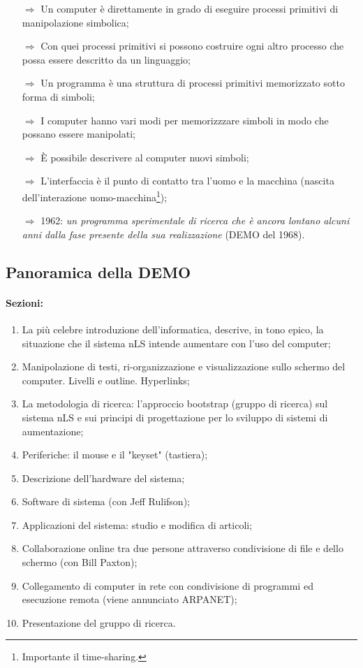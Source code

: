 \begin{itemize}
    \item [$\Rightarrow$] Un computer è direttamente in grado di eseguire processi primitivi di manipolazione simbolica;
    \item [$\Rightarrow$] Con quei processi primitivi si possono costruire ogni altro processo che possa essere descritto da un linguaggio;
    \item [$\Rightarrow$] Un programma è una struttura di processi primitivi memorizzato sotto forma di simboli;
    \item [$\Rightarrow$] I computer hanno vari modi per memorizzzare simboli in modo che possano essere manipolati;
    \item [$\Rightarrow$] È possibile descrivere al computer nuovi simboli;
    \item [$\Rightarrow$] L'interfaccia è il punto di contatto tra l'uomo e la macchina (nascita dell'interazione uomo-macchina\footnote{Importante il time-sharing.});
    \item [$\Rightarrow$] 1962: \textit{un programma sperimentale di ricerca che è ancora lontano alcuni anni dalla fase presente della sua realizzazione} (DEMO del 1968).
\end{itemize}

\subsection{Panoramica della DEMO}

\paragraph{Sezioni:}

\begin{enumerate}
    \item La più celebre introduzione dell'informatica, descrive, in tono epico,
    la situazione che il sistema nLS intende aumentare con l'uso del computer;
    \item Manipolazione di testi, ri-organizzazione e visualizzazione sullo schermo del 
    computer. Livelli e outline. Hyperlinks;
    \item La metodologia di ricerca: l'approccio bootstrap (gruppo di ricerca) sul sistema nLS
    e sui principi di progettazione per lo sviluppo di sistemi di aumentazione;
    \item Periferiche: il mouse e il "keyset" (tastiera);
    \item Descrizione dell'hardware del sistema;
    \item Software di sistema (con Jeff Rulifson);
    \item Applicazioni del sistema: studio e modifica di articoli;
    \item Collaborazione online tra due persone attraverso condivisione di file e dello schermo (con Bill Paxton);
    \item Collegamento di computer in rete con condivisione di programmi ed esecuzione remota (viene annunciato ARPANET);
    \item Presentazione del gruppo di ricerca.
\end{enumerate}

